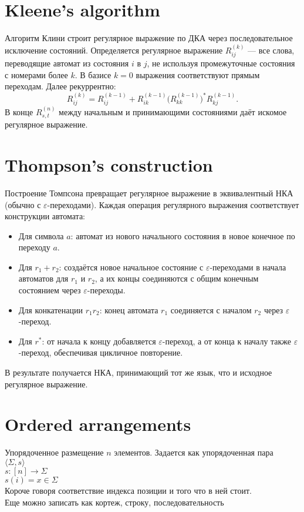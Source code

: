 \documentclass{article}
\begin{document}
	\section{Kleene’s algorithm}
	Алгоритм Клини строит регулярное выражение по ДКА через последовательное исключение состояний. Определяется регулярное выражение $R_{ij}^{(k)}$ --- все слова, переводящие автомат из состояния $i$ в $j$, не используя промежуточные состояния с номерами более $k$. В базисе $k=0$ выражения соответствуют прямым переходам. Далее рекуррентно:
	\[
	R_{ij}^{(k)} = R_{ij}^{(k-1)} + R_{ik}^{(k-1)} \bigl(R_{kk}^{(k-1)}\bigr)^* R_{kj}^{(k-1)}.
	\]
	В конце $R_{s,t}^{(n)}$ между начальным и принимающими состояниями даёт искомое регулярное выражение.
	
	\section{Thompson’s construction}
	Построение Томпсона превращает регулярное выражение в эквивалентный НКА (обычно с $\varepsilon$-переходами). Каждая операция регулярного выражения соответствует конструкции автомата:
	\begin{itemize}
		\item Для символа $a$: автомат из нового начального состояния в новое конечное по переходу $a$.
		\item Для $r_1 + r_2$: создаётся новое начальное состояние с $\varepsilon$-переходами в начала автоматов для $r_1$ и $r_2$, а их концы соединяются с общим конечным состоянием через $\varepsilon$-переходы.
		\item Для конкатенации $r_1 r_2$: конец автомата $r_1$ соединяется с началом $r_2$ через $\varepsilon$-переход.
		\item Для $r^*$: от начала к концу добавляется $\varepsilon$-переход, а от конца к началу также $\varepsilon$-переход, обеспечивая цикличное повторение.
	\end{itemize}
	В результате получается НКА, принимающий тот же язык, что и исходное регулярное выражение.
	
	\section{Ordered arrangements}
	Упорядоченное размещение $n$ элементов. Задается как упорядоченная пара\\ 
	$\langle \Sigma, s \rangle$\\
	$s \colon [n] \rightarrow \Sigma$\\
	$s(i) = x \in \Sigma$\\
	Короче говоря соответствие индекса позиции и того что в ней стоит.\\
	Еще можно записать как кортеж, строку, последовательность
	
\end{document}
